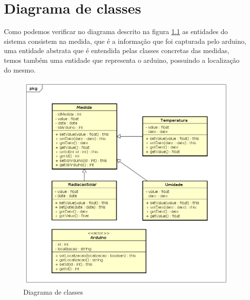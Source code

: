 \chapter{Diagrama de classes}

Como podemos verificar no diagrama descrito na figura \ref{figure_diagrama_classe} as entidades do sistema consistem na medida, que é a informação que foi capturada pelo arduino, uma entidade abstrata que é entendida pelas classes concretas das medidas, temos também uma entidade que representa o arduino, possuindo a localização do mesmo.

\begin{figure}[H]
    \label{figure_diagrama_classe}
    \centering
    \caption{Diagrama de classes}
    \includegraphics[scale=0.6]{diagrams/classe.png}
    \hfill
\end{figure}
